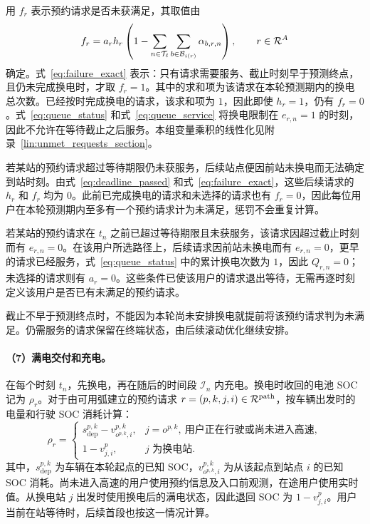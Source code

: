 用 $f_r$ 表示预约请求是否未获满足，其取值由
\begin{equation}
f_r=a_rh_r\left(
1-\sum_{n\in\mathcal T_\ell}
\sum_{b\in\mathcal B_{i(r)}}\alpha_{b,r,n}
\right),\qquad r\in\mathcal R^A
\label{eq:failure_exact}
\end{equation}
确定。式~\eqref{eq:failure_exact} 表示：只有请求需要服务、截止时刻早于预测终点，且仍未完成换电时，才取 $f_r=1$。其中的求和项为该请求在本轮预测期内的换电总次数。已经按时完成换电的请求，该求和项为 $1$，因此即使 $h_r=1$，仍有 $f_r=0$。式~\eqref{eq:queue_status} 和式~\eqref{eq:queue_service} 将换电限制在 $e_{r,n}=1$ 的时刻，因此不允许在等待截止之后服务。本组变量乘积的线性化见附录~\ref{lin:unmet_requests_section}。

若某站的预约请求超过等待期限仍未获服务，后续站点便因前站未换电而无法确定到站时刻。由式~\eqref{eq:deadline_passed} 和式~\eqref{eq:failure_exact}，这些后续请求的 $h_r$ 和 $f_r$ 均为 $0$。此前已完成换电的请求和未选择的请求也有 $f_r=0$，因此每位用户在本轮预测期内至多有一个预约请求计为未满足，惩罚不会重复计算。

若某站的预约请求在 $t_n$ 之前已超过等待期限且未获服务，该请求因超过截止时刻而有 $e_{r,n}=0$。在该用户所选路径上，后续请求因前站未换电而有 $e_{r,n}=0$，更早的请求已经服务，式~\eqref{eq:queue_status} 中的累计换电次数为 $1$，因此 $Q_{r,n}=0$；未选择的请求则有 $a_r=0$。这些条件已使该用户的请求退出等待，无需再逐时刻定义该用户是否已有未满足的预约请求。

截止不早于预测终点时，不能因为本轮尚未安排换电就提前将该预约请求判为未满足。仍需服务的请求保留在终端状态，由后续滚动优化继续安排。

\paragraph{（7）满电交付和充电。}
在每个时刻 $t_n$，先换电，再在随后的时间段 $\mathcal I_n$ 内充电。换电时收回的电池 SOC 记为 $\rho_r$。对于由可用弧建立的预约请求 $r=(p,k,j,i)\in\mathcal R^{\mathrm{path}}$，按车辆出发时的电量和行驶 SOC 消耗计算：
\[
\rho_r=
\begin{cases}
s_{\mathrm{dep}}^{p,k}-v_{o^{p,k},i}^{p,k},&j=o^{p,k},\ \text{用户正在行驶或尚未进入高速},\\
1-v_{j,i}^{p},&j\text{ 为换电站}.
\end{cases}
\]
其中，$s_{\mathrm{dep}}^{p,k}$ 为车辆在本轮起点的已知 SOC，$v_{o^{p,k},i}^{p,k}$ 为从该起点到站点 $i$ 的已知 SOC 消耗。尚未进入高速的用户使用预约信息及入口前观测，在途用户使用实时值。从换电站 $j$ 出发时使用换电后的满电状态，因此退回 SOC 为 $1-v_{j,i}^{p}$。用户当前在站等待时，后续首段也按这一情况计算。

